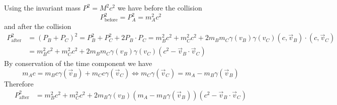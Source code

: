 


Using the invariant mass $P^2 = M^2 c^2$ we have before the collision
\begin{equation*}
    P_\text{before}^2 = P_A^2 = m_A^2 c^2
\end{equation*}
and after the collision
\begin{align*}
    P_\text{after}^2 &= (P_B + P_C)^2 = P_B^2 +P_C^2 + 2 P_B \cdot P_C = m_B^2 c^2 + m_C^2 c^2 + 2 m_B m_C \gamma(v_B) \gamma(v_C) (c, \vec{v}_B) \cdot (c, \vec{v}_C) \\
    &= m_B^2 c^2 + m_C^2 c^2 + 2 m_B m_C \gamma(v_B) \gamma(v_C) (c^2 - \vec{v}_B \cdot \vec{v}_C)
\end{align*}
By conservation of the time component we have
\begin{equation*}
    m_A c = m_B c \gamma(\vec{v}_B) + m_C c \gamma(\vec{v}_C) \iff m_C \gamma(\vec{v}_C) = m_A - m_B \gamma(\vec{v}_B)
\end{equation*}
Therefore
\begin{align*}
    P_\text{after}^2 &= m_B^2 c^2 + m_C^2 c^2 + 2 m_B \gamma(v_B) (m_A - m_B \gamma(\vec{v}_B)) (c^2 - \vec{v}_B \cdot \vec{v}_C)\\
\end{align*}